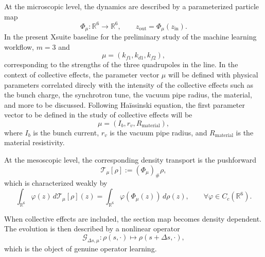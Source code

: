 \documentclass[11pt,a4paper]{article}
\begin{document}
\begin{sloppypar}
At the microscopic level, the dynamics are described by a parameterized particle map
\begin{equation}
 \Phi_\mu : \mathbb{R}^6 \to \mathbb{R}^6,
 \qquad
 z_{\mathrm{out}} = \Phi_\mu(z_{\mathrm{in}}).
 \label{eq:microscopic-map}
\end{equation}
In the present Xsuite baseline for the preliminary study of the machine learning workflow, $m=3$ and
\begin{equation}
 \mu = (k_{f1},k_{d1},k_{f2}),
\end{equation}
corresponding to the strengths of the three quadrupoles in the line. In the context of collective effects, the parameter vector $\mu$ will be defined with physical parameters correlated direcly with the intensity of the collective effects such as the bunch charge, the synchrotron tune, the vacuum pipe radius, the material, and more to be discussed. Following Ha\"issinski equation, the first parameter vector to be defined in the study of collective effects will be 
\begin{equation}
    \mu = (I_b, r_v, R_{\text{material}} ),
\end{equation}
where $I_b$ is the bunch current, $r_v$ is the vacuum pipe radius, and $R_{\text{material}}$ is the material resistivity.

At the mesoscopic level, the corresponding density transport is the pushforward
\begin{equation}
 \mathcal{T}_\mu[\rho] := (\Phi_\mu)_\# \rho,
 \label{eq:pushforward-operator}
\end{equation}
which is characterized weakly by
\begin{equation}
 \int_{\mathbb{R}^6} \varphi(z)\, d\mathcal{T}_\mu[\rho](z)
 =
 \int_{\mathbb{R}^6} \varphi(\Phi_\mu(z))\, d\rho(z),
 \qquad \forall \varphi \in C_c(\mathbb{R}^6).
 \label{eq:pushforward-weak}
\end{equation}

When collective effects are included, the section map becomes density dependent. The evolution is then described by a nonlinear operator
\begin{equation}
 \mathcal{G}_{\Delta s,\mu} : \rho(s,\cdot) \mapsto \rho(s+\Delta s,\cdot),
 \label{eq:nonlinear-operator-section}
\end{equation}
which is the object of genuine operator learning.


\end{sloppypar}
\end{document}
